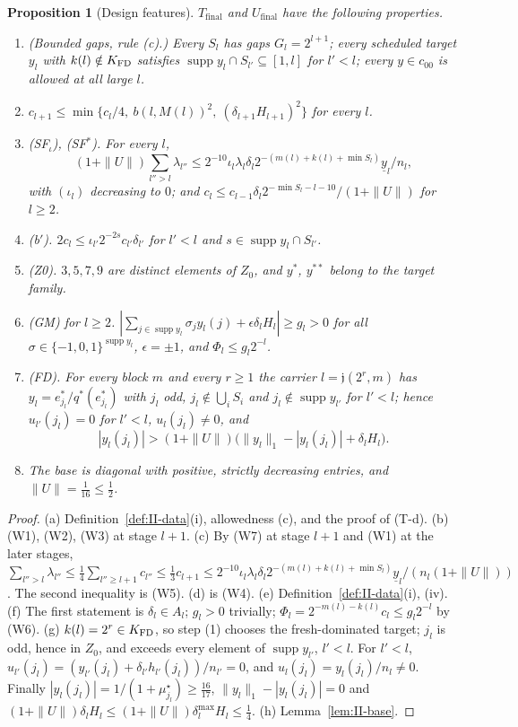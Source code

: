 \documentclass[10pt]{amsart}
\newtheorem{proposition}[theorem]{Proposition}
\theoremstyle{definition}
\theoremstyle{remark}
\newcommand{\supp}{\operatorname{supp}}
\begin{document}
\begin{proposition}[Design features]\label{prop:II-features}
$T_{\mathrm{final}}$ and $U_{\mathrm{final}}$ have the following
properties.
\begin{enumerate}
\item[(a)] \textup{(Bounded gaps, rule (c).)}  Every $S_l$ has gaps
$G_l=2^{l+1}$; every scheduled target $y_l$ with $k(l)\notin K_{\rm FD}$
satisfies $\supp y_l\cap S_{l'}\subseteq[1,l]$ for $l'<l$; every
$y\in c_{00}$ is allowed at all large $l$.
\item[(b)] $c_{l+1}\le\min\{c_l/4,\ b(l,M(l))^2,\
(\delta_{l+1}H_{l+1})^2\}$ for every $l$.
\item[(c)] \textup{(SF$_\iota$), (SF$^*$).}  For every $l$,
\[
 (1+\|U\|)\sum_{l''>l}\lambda_{l''}\le2^{-10}\iota_l\lambda_l\delta_l
 2^{-(m(l)+k(l)+\min S_l)}\underline y_l/n_l,
\]
with $(\iota_l)$ decreasing to $0$; and
$c_l\le c_{l-1}\delta_l2^{-\min S_l-l-10}/(1+\|U\|)$ for $l\ge2$.
\item[(d)] \textup{(b$'$).}  $2c_l\le\iota_{l'}2^{-2s}c_{l'}\delta_{l'}$ for
$l'<l$ and $s\in\supp y_l\cap S_{l'}$.
\item[(e)] \textup{(Z0).}  $3,5,7,9$ are distinct elements of $Z_0$, and
$y^\ast$, $y^{\ast\ast}$ belong to the target family.
\item[(f)] \textup{(GM) for $l\ge2$.}  $|\sum_{j\in\supp y_l}\sigma_j
y_l(j)+\epsilon\delta_lH_l|\ge g_l>0$ for all $\sigma\in\{-1,0,1\}^{\supp
y_l}$, $\epsilon=\pm1$, and $\Phi_l\le g_l2^{-l}$.
\item[(g)] \textup{(FD).}  For every block $m$ and every $r\ge1$ the
carrier $l=\mathfrak j(2^r,m)$ has $y_l=e_{j_l}^*/q^*(e_{j_l}^*)$ with
$j_l$ odd, $j_l\notin\bigcup_iS_i$ and $j_l\notin\supp y_{l'}$ for
$l'<l$; hence $u_{l'}(j_l)=0$ for $l'<l$, $u_l(j_l)\ne0$, and
\[
 |y_l(j_l)|>(1+\|U\|)\big(\|y_l\|_1-|y_l(j_l)|+\delta_lH_l\big).
\]
\item[(h)] The base is diagonal with positive, strictly decreasing
entries, and $\|U\|=\frac1{16}\le\frac12$.
\end{enumerate}
\end{proposition}

\begin{proof}
(a) Definition~\ref{def:II-data}(i), allowedness (c), and the proof of
(T-d).  (b) (W1), (W2), (W3) at stage $l+1$.  (c) By (W7) at stage $l+1$
and (W1) at the later stages, $\sum_{l''>l}\lambda_{l''}\le\frac14\sum_{l''
\ge l+1}c_{l''}\le\frac13c_{l+1}\le2^{-10}\iota_l\lambda_l\delta_l
2^{-(m(l)+k(l)+\min S_l)}\underline y_l/(n_l(1+\|U\|))$.  The second
inequality is (W5).  (d) is (W4).  (e) Definition~\ref{def:II-data}(i),
(iv).  (f) The first statement is $\delta_l\in A_l$; $g_l>0$ trivially;
$\Phi_l=2^{-m(l)-k(l)}c_l\le g_l2^{-l}$ by (W6).  (g) $k(l)=2^r\in K_{\rm
FD}$, so step (1) chooses the fresh-dominated target; $j_l$ is odd, hence
in $Z_0$, and exceeds every element of $\supp y_{l'}$, $l'<l$.  For
$l'<l$, $u_{l'}(j_l)=(y_{l'}(j_l)+\delta_{l'}h_{l'}(j_l))/n_{l'}=0$, and
$u_l(j_l)=y_l(j_l)/n_l\ne0$.  Finally $|y_l(j_l)|=1/(1+\mu^\star_{j_l})\ge
\frac{16}{17}$, $\|y_l\|_1-|y_l(j_l)|=0$ and
$(1+\|U\|)\delta_lH_l\le(1+\|U\|)\delta^{\max}_lH_l\le\frac14$.  (h)
Lemma~\ref{lem:II-base}.
\end{proof}
\end{document}
